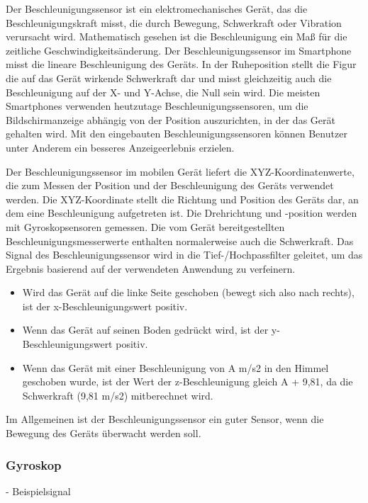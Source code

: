 Der Beschleunigungssensor ist ein elektromechanisches Gerät, das die Beschleunigungskraft misst, die durch Bewegung, Schwerkraft oder Vibration verursacht wird. Mathematisch gesehen ist die Beschleunigung ein Maß für die zeitliche Geschwindigkeitsänderung.
Der Beschleunigungssensor im Smartphone misst die lineare Beschleunigung des Geräts. In der Ruheposition stellt die Figur die auf das Gerät wirkende Schwerkraft dar und misst gleichzeitig auch die Beschleunigung auf der X- und Y-Achse, die Null sein wird.
Die meisten Smartphones verwenden heutzutage Beschleunigungssensoren, um die Bildschirmanzeige abhängig von der Position auszurichten, in der das Gerät gehalten wird. Mit den eingebauten Beschleunigungssensoren können Benutzer unter Anderem ein besseres Anzeigeerlebnis erzielen. \citep{Sharma2020}

Der Beschleunigungssensor im mobilen Gerät liefert die XYZ-Koordinatenwerte, die zum Messen der Position und der Beschleunigung des Geräts verwendet werden. Die XYZ-Koordinate stellt die Richtung und Position des Geräts dar, an dem eine Beschleunigung aufgetreten ist. Die Drehrichtung und -position werden mit Gyroskopsensoren gemessen. Die vom Gerät bereitgestellten Beschleunigungsmesserwerte enthalten normalerweise auch die Schwerkraft. Das Signal des Beschleunigungssensor wird in die Tief-/Hochpassfilter geleitet, um das Ergebnis basierend auf der verwendeten Anwendung zu verfeinern. \citep{Sathish2021}
\begin{itemize}
	\item Wird das Gerät auf die linke Seite geschoben (bewegt sich also nach rechts), ist der x-Beschleunigungswert positiv.
	\item Wenn das Gerät auf seinen Boden gedrückt wird, ist der y-Beschleunigungswert positiv.
	\item Wenn das Gerät mit einer Beschleunigung von A m/s2 in den Himmel geschoben wurde, ist der Wert der z-Beschleunigung gleich A + 9,81, da die Schwerkraft (9,81 m/s2) mitberechnet wird.
\end{itemize}
Im Allgemeinen ist der Beschleunigungssensor ein guter Sensor, wenn die Bewegung des Geräts überwacht werden soll. \citep{DevelopersMotionSen}

%
%
%
%
\subsubsection{Gyroskop}
- Beispielsignal\\

